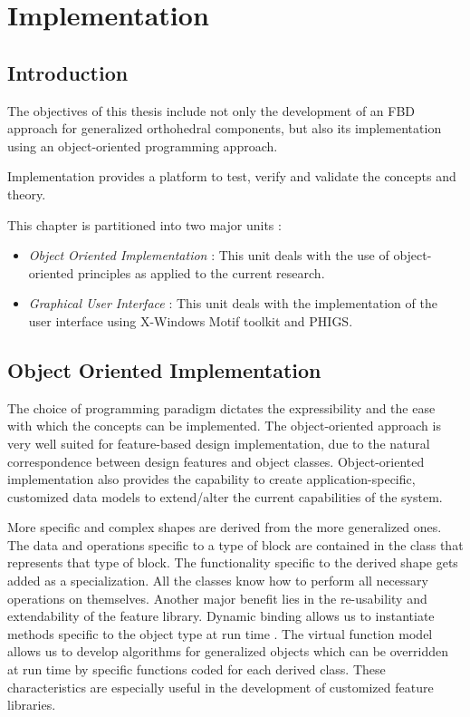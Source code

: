 \chapter{Implementation}

	\section{Introduction}

		The objectives of this thesis include not only the development of
		an FBD approach for generalized orthohedral components, but also
		its implementation using an object-oriented programming approach.

		Implementation provides a platform to test, verify and validate the 
		concepts and theory.
		
		This chapter is partitioned into two major units :
			\begin{itemize}
				\item
				{\em Object Oriented Implementation} : This unit deals with the
				use of object-oriented principles as applied to the current 
				research.
				\item
				{\em Graphical User Interface} : This unit deals with the 
				implementation of the user interface using X-Windows Motif 
				toolkit and PHIGS. 

			\end{itemize}

	\section{Object Oriented Implementation}

		The choice of programming paradigm dictates the expressibility and
		the ease with which the concepts can be implemented. The object-oriented
		approach is very well suited for feature-based design implementation,
		due to the natural correspondence between design features and 
		object classes. Object-oriented implementation also provides the
		capability to create application-specific, customized data models
		to extend/alter the current capabilities of the system.

        More specific and complex shapes are derived from the more generalized 
		ones. The data and
        operations specific to a type of block are contained in the
        class that represents that type of block. The functionality specific 
		to the derived shape gets added
        as a specialization. All the classes know how to perform all necessary
		operations on themselves. Another major benefit lies in the 
		re-usability and extendability of the feature library. 
		Dynamic binding allows us to instantiate 
        methods specific to the object type at run time . The virtual function 
		model allows us to develop algorithms for generalized objects 
		which can be overridden at run time by specific
        functions coded for each derived class. These characteristics
        are especially useful in the development of customized feature 
		libraries. 


